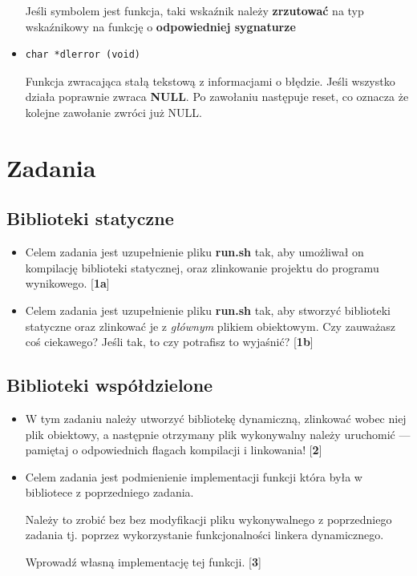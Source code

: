 \documentclass[12pt]{article}
\begin{document}
\begin{itemize}
  Jeśli symbolem jest funkcja, taki wskaźnik należy \textbf{zrzutować} na typ
  wskaźnikowy na funkcję o \textbf{odpowiedniej sygnaturze}

\item
\begin{lstlisting}
char *dlerror (void)
\end{lstlisting}
  Funkcja zwracająca stałą tekstową z informacjami o błędzie. Jeśli wszystko
  działa poprawnie zwraca \textbf{NULL}. Po zawołaniu następuje reset, co
  oznacza że kolejne zawołanie zwróci już NULL.
\end{itemize}

\section{Zadania}
\subsection{Biblioteki statyczne}
\begin{itemize}
\item Celem zadania jest uzupełnienie pliku \textbf{run.sh} tak, aby umożliwał
  on kompilację biblioteki statycznej, oraz zlinkowanie projektu do programu
  wynikowego. [\textbf{1a}]
\item Celem zadania jest uzupełnienie pliku \textbf{run.sh} tak, aby stworzyć
  biblioteki statyczne oraz zlinkować je z \textit{głównym} plikiem obiektowym.
  Czy zauważasz coś ciekawego? Jeśli tak, to czy potrafisz to wyjaśnić?
  [\textbf{1b}]
\end{itemize}
\subsection{Biblioteki współdzielone}
\begin{itemize}
\item W tym zadaniu należy utworzyć bibliotekę dynamiczną, zlinkować wobec niej
  plik obiektowy, a następnie otrzymany plik wykonywalny należy uruchomić ---
  pamiętaj o odpowiednich flagach kompilacji i linkowania! [\textbf{2}]
\item Celem zadania jest podmienienie implementacji funkcji która była w
  bibliotece z poprzedniego zadania.

  Należy to zrobić bez bez modyfikacji pliku wykonywalnego z poprzedniego
  zadania tj. poprzez wykorzystanie funkcjonalności linkera dynamicznego.

  Wprowadź własną implementację tej funkcji. [\textbf{3}]
\end{itemize}
\end{document}
